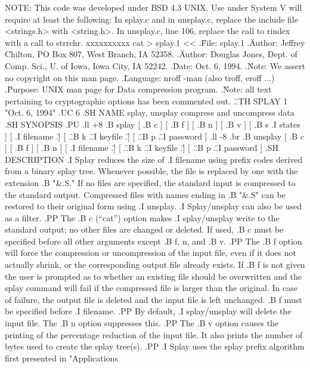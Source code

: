   NOTE:  This code was developed under BSD 4.3 UNIX.  Use under System V will
	require at least the following:  In splay.c and in unsplay.c, replace
	the include file <strings.h> with <string.h>.  In unsplay.c, line 106,
	replace the call to rindex with a call to strrchr.
xxxxxxxxxx
cat > splay.1 <<\xxxxxxxxxx
.\" File: splay.1
.\" Author: Jeffrey Chilton, PO Box 807, West Branch, IA 52358.
.\" Author: Douglas Jones, Dept. of Comp. Sci., U. of Iowa, Iowa City, IA 52242.
.\" Date: Oct. 6, 1994.
.\" Note: We assert no copyright on this man page.
.\" Language: nroff -man (also troff, eroff ...)
.\" Purpose: UNIX man page for Data compression program.
.\" Note: all text pertaining to cryptographic options has been commented out.
.\"
.TH SPLAY 1 "Oct. 6, 1994"
.UC 6
.SH NAME
splay, unsplay \- compress and uncompress data
.SH SYNOPSIS
.PU
.ll +8
.B splay
[
.B \-c
] [
.B \-f
] [
.B \-n
] [
.B \-v
] [
.B \-s
.I states
] [
.I filename
.\" ] [
.\" .B \-k
.\" .I keyfile
.\" ] [
.\" .B \-p
.\" .I password
]
.ll -8
.br
.B unsplay
[
.B \-c
] [
.B \-f
] [
.B \-n
] [
.I filename
.\" ] [
.\" .B \-k
.\" .I keyfile
.\" ] [
.\" .B \-p
.\" .I password
]
.SH DESCRIPTION
.I Splay
reduces the size of
.I filename
using prefix codes derived from a binary splay tree.  Whenever possible,
the file is replaced by one with the extension
.B "\&.S."
If no files are specified, the standard input is compressed to the
standard output.  Compressed files with names ending in
.B "\&.S"
can be restored to their original form using
.I unsplay.
.I Splay/unsplay
can also be used as a filter.
.PP
The
.B \-c
(``cat'') option makes
.I splay/unsplay
write to the standard output; no other files are changed or deleted.  If used,
.B \-c
must be specified before all other arguments except
.B \-f, \-n,
and
.B \-v.
.PP
The
.B \-f
option will force the compression or uncompression of the input file,
even if it does not actually shrink, or the corresponding output file
already exists.  If
.B \-f
is not given the user is prompted as to whether an existing
file should be overwritten and the splay command will fail if the
compressed file is larger than the original.  In case of failure,
the output file is deleted and the input file is left unchanged.
.B \-f
must be specified before
.I filename.
.PP
By default,
.I splay/unsplay
will delete the input file.  The
.B \-n
option suppresses this.
.PP
The
.B \-v
option causes the printing of the percentage reduction of the input file.
It also prints the number of bytes used to create the splay tree(s).
.PP
.I Splay
uses the splay prefix algorithm first presented in "Applications
